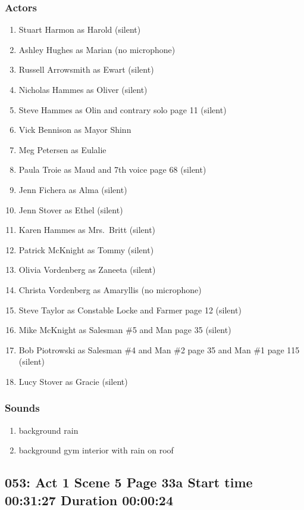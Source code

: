 \subsubsection{Actors}
\begin{enumerate}
\item Stuart Harmon as Harold (silent)
\item Ashley Hughes as Marian (no microphone)
\item Russell Arrowsmith as Ewart (silent)
\item Nicholas Hammes as Oliver (silent)
\item Steve Hammes as Olin and contrary solo page 11 (silent)
\item Vick Bennison as Mayor Shinn
\item Meg Petersen as Eulalie
\item Paula Troie as Maud and 7th voice page 68 (silent)
\item Jenn Fichera as Alma (silent)
\item Jenn Stover as Ethel (silent)
\item Karen Hammes as Mrs.~Britt (silent)
\item Patrick McKnight as Tommy (silent)
\item Olivia Vordenberg as Zaneeta (silent)
\item Christa Vordenberg as Amaryllis (no microphone)
\item Steve Taylor as Constable Locke and Farmer page 12 (silent)
\item Mike McKnight as Salesman \#5 and Man page 35 (silent)
\item Bob Piotrowski as Salesman \#4 and Man \#2 page 35 and Man \#1 page 115 (silent)
\item Lucy Stover as Gracie (silent)
\end{enumerate}

\subsubsection{Sounds}
\begin{enumerate}
\item background rain
\item background gym interior with rain on roof
\end{enumerate}
\subsection{053: Act 1 Scene 5 Page 33a Start time 00:31:27 Duration 00:00:24}

